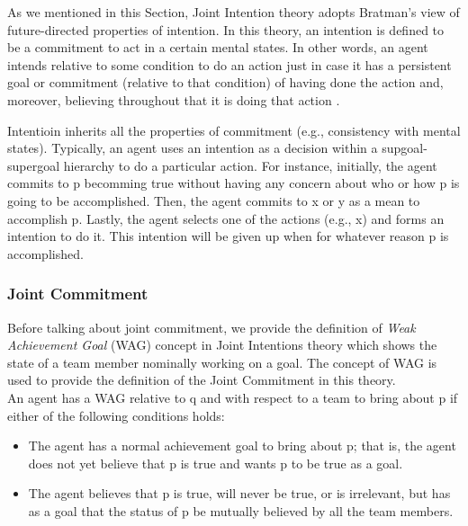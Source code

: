 \documentclass[11pt]{article}
\begin{document}
As we mentioned in this Section, Joint Intention theory adopts Bratman's view of
future-directed properties of intention. In this theory, an intention is
defined to be a commitment to act in a certain mental states. In other words, an
agent intends relative to some condition to do an action just in case it has a
persistent goal or commitment (relative to that condition) of having done the
action and, moreover, believing throughout that it is doing that action
\cite{cohen:teamwork}.

Intentioin inherits all the properties of commitment (e.g., consistency with
mental states). Typically, an agent uses an intention as a decision within a
supgoal-supergoal hierarchy to do a particular action. For instance, initially,
the agent commits to p becomming true without having any concern about who or
how p is going to be accomplished. Then, the agent commits to x or y as a mean to
accomplish p. Lastly, the agent selects one of the actions (e.g., x) and forms
an intention to do it. This intention will be given up when for whatever reason
p is accomplished.

\subsubsection{Joint Commitment}
\label{sec:jpg}

Before talking about joint commitment, we provide the definition of \textit{Weak
Achievement Goal} (WAG) concept in Joint Intentions theory which shows the state
of a team member nominally working on a goal. The concept of WAG is used to
provide the definition of the Joint Commitment in this theory.\\

An agent has a WAG relative to q and with respect to a team to bring about p if
either of the following conditions holds:

\begin{itemize}
  \item The agent has a normal achievement goal to bring about p; that is, the
  agent does not yet believe that p is true and wants p to be true as a goal.
  \item The agent believes that p is true, will never be true, or is irrelevant,
  but has as a goal that the status of p be mutually believed by all the team
  members.
\end{itemize}
\end{document}
